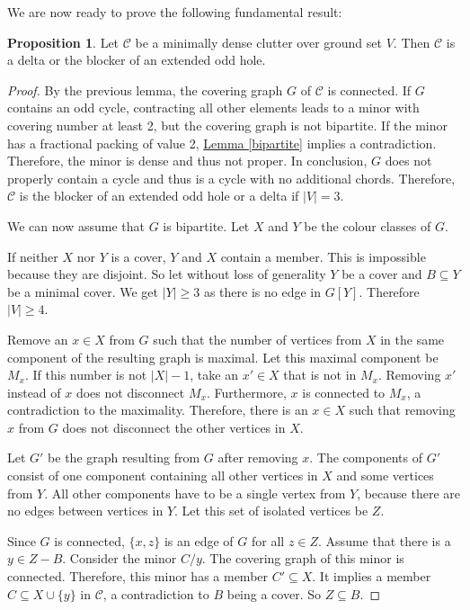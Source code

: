 \documentclass[a4paper, 12pt]{scrbook}
\theoremstyle{definition}
\newtheorem{proposition}[theorem]{Proposition}
\begin{document}
   We are now ready to prove the following fundamental result:

   \begin{proposition}\label{mindense}
       Let $\mathcal{C}$ be a minimally dense clutter over ground set $V$.
       Then $\mathcal{C}$ is a delta or the blocker of an extended odd hole.
   \end{proposition}

   \begin{proof}
       By the previous lemma, the covering graph $G$ of $\mathcal{C}$ is connected.
       If $G$ contains an odd cycle, contracting all other elements leads to a minor with covering number at least 2, but the covering graph is not bipartite.
       If the minor has a fractional packing of value 2, \hyperref[bipartite]{Lemma \ref*{bipartite}} implies a contradiction. Therefore, the minor is dense and thus not proper.
       In conclusion, $G$ does not properly contain a cycle and thus is a cycle with no additional chords.
       Therefore, $\mathcal{C}$ is the blocker of an extended odd hole or a delta if $|V|=3$.

       We can now assume that $G$ is bipartite.
       Let $X$ and $Y$ be the colour classes of $G$.

       If neither $X$ nor $Y$ is a cover, $Y$ and $X$ contain a member.
       This is impossible because they are disjoint.
       So let without loss of generality $Y$ be a cover and $B \subseteq Y$ be a minimal cover.
       We get $|Y|\geq 3$ as there is no edge in $G[Y]$.
       Therefore $|V|\geq 4$.

       Remove an $x \in X$ from $G$ such that the number of vertices from $X$ in the same component of the resulting graph is maximal.
       Let this maximal component be $M_x$.
       If this number is not $|X|-1$, take an $x' \in X$ that is not in $M_x$.
       Removing $x'$ instead of $x$ does not disconnect $M_x$. Furthermore, $x$ is connected to $M_x$, a contradiction to the maximality.
       Therefore, there is an $x \in X$ such that removing $x$ from $G$ does not disconnect the other vertices in $X$.

       Let $G'$ be the graph resulting from $G$ after removing $x$.
       The components of $G'$ consist of one component containing all other vertices in $X$ and some vertices from $Y$.
       All other components have to be a single vertex from $Y$, because there are no edges between vertices in $Y$.
       Let this set of isolated vertices be $Z$.

       Since $G$ is connected, $\{x,z\}$ is an edge of $G$ for all $z \in Z$.
       Assume that there is a $y \in Z-B$.
       Consider the minor $C / y$.
       The covering graph of this minor is connected.
       Therefore, this minor has a member $C' \subseteq X$.
       It implies a member $C \subseteq X \cup \{y\}$ in $\mathcal{C}$, a contradiction to $B$ being a cover. So $Z \subseteq B$.


\end{proof}
\end{document}
